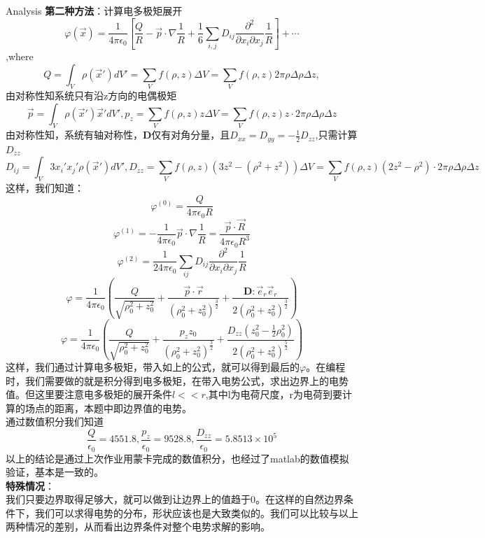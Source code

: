 \documentclass[letterpaper,12pt]{article}
\begin{document}
\begin{section}{Analysis}
            \indent \textbf{第二种方法}：计算电多极矩展开
            $$\varphi(\vec x)=\frac{1}{4\pi\epsilon_0}[\frac{Q}{R}-\vec p\cdot\nabla\frac{1}{R}+\frac{1}{6}\sum\limits_{i,j}D_{ij}\frac{\partial^2}{\partial x_i \partial x_j}\frac{1}{R}]+\cdots$$
            ,where
            $$Q=\int_V \rho(\vec x')dV'=\sum\limits_Vf(\rho,z)\Delta V=\sum\limits_V f(\rho,z)2\pi \rho \Delta\rho \Delta z,$$
            由对称性知系统只有沿z方向的电偶极矩
            $$\vec p=\int_V \rho(\vec x')\vec x'dV',p_z=\sum_Vf(\rho,z)z\Delta V=\sum_Vf(\rho,z)z\cdot 2\pi\rho\Delta \rho \Delta z $$
            由对称性知，系统有轴对称性，\textbf{D}仅有对角分量，且$D_{xx}=D_{yy}=-\frac{1}{2}D_{zz}$,只需计算$D_{zz}$
            $$D_{ij}=\int_V 3x_i'x_j'\rho(\vec x')dV',D_{zz}=\sum_V f(\rho,z)(3z^2-(\rho^2+z^2))\Delta V=\sum_V f(\rho,z)(2z^2-\rho^2)\cdot2\pi\rho\Delta\rho\Delta z$$
            这样，我们知道：
            $$\varphi^{(0)}=\frac{Q}{4\pi\epsilon_0R}$$
            $$\varphi^{(1)}=-\frac{1}{4\pi\epsilon_0}\vec p \cdot \nabla \frac{1}{R}=\frac{\vec p\cdot \vec R}{4\pi\epsilon_0 R^3}$$
            $$\varphi^{(2)}=\frac{1}{24\pi\epsilon_0}\sum\limits_{ij}D_{ij}\frac{\partial^2}{\partial x_i \partial x_j}\frac{1}{R}$$
            $$\varphi=\frac{1}{4\pi\epsilon_0}(\frac{Q}{\sqrt{\rho_0^2+z_0^2}}+\frac{\vec p\cdot \vec r}{(\rho_0^2+z_0^2)^{\frac{3}{2}}}+\frac{\textbf{D}:\vec e_r \vec e_r}{2(\rho_0^2+z_0^2)^{\frac{3}{2}}})$$
            $$\varphi=\frac{1}{4\pi\epsilon_0}(\frac{Q}{\sqrt{\rho_0^2+z_0^2}}+\frac{p_z z_0}{(\rho_0^2+z_0^2)^{\frac{3}{2}}}+\frac{D_{zz}(z_0^2-\frac{1}{2}\rho_0^2)}{2(\rho_0^2+z_0^2)^{\frac{5}{2}}})$$
            这样，我们通过计算电多极矩，带入如上的公式，就可以得到最后的$\varphi$。在编程时，我们需要做的就是积分得到电多极矩，在带入电势公式，求出边界上的电势值。但这里要注意电多极矩的展开条件$l <<r$,其中l为电荷尺度，r为电荷到要计算的场点的距离，本题中即边界值的电势。\\
            \indent 通过数值积分我们知道$$\frac{Q}{\epsilon_0}=4551.8,\frac{p_z}{\epsilon_0}=9528.8,\frac{D_{zz}}{\epsilon_0}=5.8513\times 10^5$$
            \indent 以上的结论是通过上次作业用蒙卡完成的数值积分，也经过了matlab的数值模拟验证，基本是一致的。\\

            \textbf{特殊情况}：\\ \indent 我们只要边界取得足够大，就可以做到让边界上的值趋于0。在这样的自然边界条件下，我们可以求得电势的分布，形状应该也是大致类似的。我们可以比较与以上两种情况的差别，从而看出边界条件对整个电势求解的影响。\\


\end{section}
\end{document}
